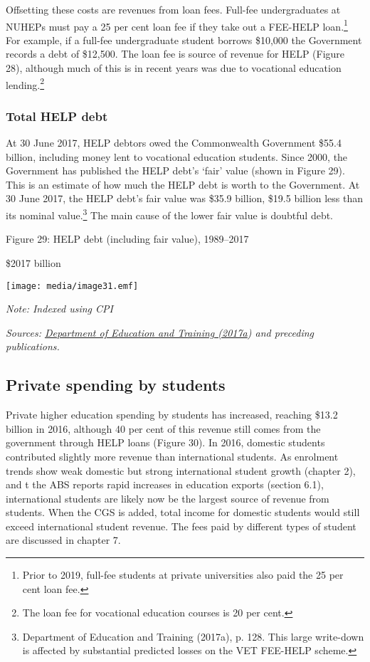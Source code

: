 \documentclass[]{book}
\begin{document}
Offsetting these costs are revenues from loan fees. Full-fee undergraduates at NUHEPs must pay a 25 per cent loan fee if they take out a FEE-HELP loan.\footnote{Prior to 2019, full-fee students at private universities also paid the 25 per cent loan fee.} For example, if a full-fee undergraduate student borrows \$10,000 the Government records a debt of \$12,500. The loan fee is source of revenue for HELP (Figure 28), although much of this is in recent years was due to vocational education lending.\footnote{The loan fee for vocational education courses is 20 per cent.}

\hypertarget{total-help-debt}{%
\subsubsection{Total HELP debt}\label{total-help-debt}}

At 30 June 2017, HELP debtors owed the Commonwealth Government \$55.4 billion, including money lent to vocational education students. Since 2000, the Government has published the HELP debt's `fair' value (shown in Figure 29). This is an estimate of how much the HELP debt is worth to the Government. At 30 June 2017, the HELP debt's fair value was \$35.9 billion, \$19.5 billion less than its nominal value.\footnote{Department of Education and Training (2017a), p. 128. This large write-down is affected by substantial predicted losses on the VET FEE-HELP scheme.} The main cause of the lower fair value is doubtful debt.

\protect\hypertarget{_Ref452807341}{}{}Figure 29: HELP debt (including fair value), 1989--2017

\$2017 billion

\texttt{[image: media/image31.emf]}

\emph{Note: Indexed using CPI}

\emph{Sources: \protect\hyperlink{_ENREF_67}{Department of Education and Training (2017a}) and preceding publications. }

\hypertarget{private-spending-by-students}{%
\subsection{Private spending by students}\label{private-spending-by-students}}

Private higher education spending by students has increased, reaching \$13.2 billion in 2016, although 40 per cent of this revenue still comes from the government through HELP loans (Figure 30). In 2016, domestic students contributed slightly more revenue than international students. As enrolment trends show weak domestic but strong international student growth (chapter 2), and t the ABS reports rapid increases in education exports (section 6.1), international students are likely now be the largest source of revenue from students. When the CGS is added, total income for domestic students would still exceed international student revenue. The fees paid by different types of student are discussed in chapter 7.
\end{document}
